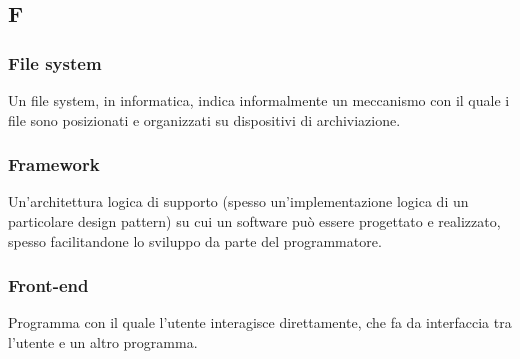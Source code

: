 \subsection*{\textbf{\hfill \Huge{F} \hfill}} 
\subsubsection*{File system}
Un file system, in informatica, indica informalmente un meccanismo con il quale i file sono posizionati e organizzati su dispositivi di archiviazione.
\subsubsection*{Framework}
Un’architettura logica di supporto (spesso un’implementazione logica di un particolare design pattern) su cui un software può essere progettato e realizzato, spesso facilitandone lo sviluppo da parte del programmatore.
\subsubsection*{Front-end}
Programma con il quale l’utente interagisce direttamente, che fa da interfaccia tra l’utente e un altro programma.
